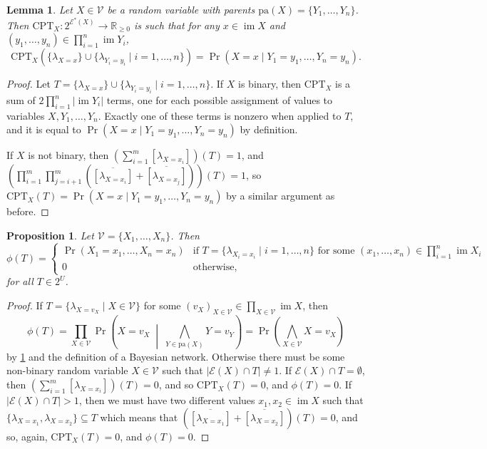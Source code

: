\documentclass{article}
\newtheorem{lemma}{Lemma}
\newtheorem{proposition}{Proposition}
\theoremstyle{definition}
\theoremstyle{remark}
\DeclareMathOperator{\im}{im}
\begin{document}
{\begin{lemma} \label{lemma:cpt}
  Let $X \in \mathcal{V}$ be a random variable with parents $\mathrm{pa}(X) = \{ Y_1,
  \dots, Y_n \}$. Then $\mathrm{CPT}_X\colon 2^{\mathcal{E}^*(X)} \to
  \mathbb{R}_{\ge 0}$ is such that for any $x \in \im X$ and $(y_1, \dots, y_n)
  \in \prod_{i=1}^n \im Y_i$,
  \[
    \mathrm{CPT}_X (\{ \lambda_{X=x} \} \cup \{ \lambda_{Y_i=y_i} \mid i = 1,
    \dots, n \}) = \Pr(X = x \mid Y_1 = y_1, \dots, Y_n = y_n).
  \]
\end{lemma}
\begin{proof}
  Let $T = \{ \lambda_{X=x} \} \cup \{ \lambda_{Y_i=y_i} \mid i = 1, \dots, n
  \}$. If $X$ is binary, then $\mathrm{CPT}_X$ is a sum of $2\prod_{i=1}^n |\im
  Y_i|$ terms, one for each possible assignment of values to variables $X, Y_1,
  \dots, Y_n$. Exactly one of these terms is nonzero when applied to $T$, and
  it is equal to $\Pr(X = x \mid Y_1 = y_1, \dots, Y_n = y_n)$ by definition.

  If $X$ is not binary, then $\left( \sum_{i=1}^m [\lambda_{X = x_i}]
  \right)(T) = 1$, and $\left( \prod_{i=1}^m \prod_{j=i+1}^m
    (\overline{[\lambda_{X = x_i}]} + \overline{[\lambda_{X = x_j}]})
  \right)(T) = 1$, so $\mathrm{CPT}_X(T) = \Pr(X = x \mid Y_1 = y_1,
  \dots, Y_n = y_n)$ by a similar argument as before.
\end{proof}

\begin{proposition} \label{lemma:full_distribution}
  Let $\mathcal{V} = \{X_1, \dots, X_n\}$. Then
  \[
    \phi(T) =
    \begin{cases}
      \Pr(X_1 = x_1, \dots, X_n = x_n) & \text{if } T = \{ \lambda_{X_i=x_i}
      \mid i = 1, \dots, n \} \text{ for some } (x_1, \dots, x_n) \in
      \prod_{i=1}^n \im X_i \\
      0 & \text{otherwise,}
    \end{cases}
  \]
  for all $T \in 2^U$.
\end{proposition}
\begin{proof}
  If $T = \{ \lambda_{X=v_X} \mid X \in \mathcal{V} \}$ for some $(v_X)_{X
    \in \mathcal{V}} \in \prod_{X \in \mathcal{V}} \im X$, then
  \[
    \phi(T) = \prod_{X \in \mathcal{V}} \Pr \left( X=v_X \;\middle|\;
      \bigwedge_{Y \in \mathrm{pa}(X)} Y=v_Y \right) = \Pr \left( \bigwedge_{X
        \in \mathcal{V}} X=v_X \right)
  \]
  by \cref{lemma:cpt} and the definition of a Bayesian network. Otherwise there
  must be some non-binary random variable $X \in \mathcal{V}$ such that
  $|\mathcal{E}(X) \cap T| \ne 1$. If $\mathcal{E}(X) \cap T = \emptyset$, then
  $\left( \sum_{i=1}^m [\lambda_{X = x_i}] \right)(T) = 0$, and so
  $\mathrm{CPT}_X(T) = 0$, and $\phi(T) = 0$. If $|\mathcal{E}(X) \cap T| > 1$,
  then we must have two different values $x_1, x_2 \in \im X$ such that
  $\{\lambda_{X=x_1}, \lambda_{X=x_2} \} \subseteq T$ which means that
  $(\overline{[\lambda_{X=x_1}]} + \overline{[\lambda_{X=x_2}]})(T) = 0$, and
  so, again, $\mathrm{CPT}_X(T) = 0$, and $\phi(T) = 0$.
\end{proof}

}
\end{document}
